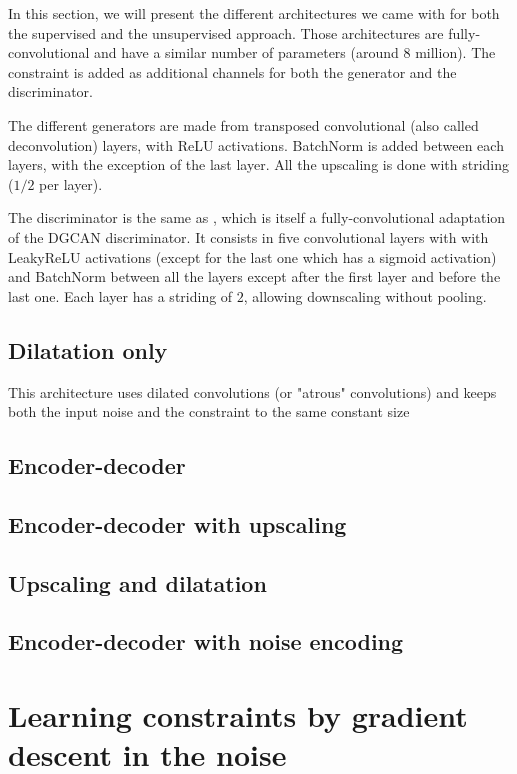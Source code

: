 \documentclass{article}
\begin{document}
	In this section, we will present the different architectures we came with for both the supervised and the unsupervised approach. Those architectures are fully-convolutional and have a similar number of parameters (around 8 million). The constraint is added as additional channels for both the generator and the discriminator.
	
	The different generators are made from transposed convolutional (also called deconvolution)  layers, with ReLU activations. BatchNorm\cite{ioffe15} is added between each layers, with the exception of the last layer. All the upscaling is done with striding ($1/2$ per layer).
	
	The discriminator is the same as \cite{jetchev}, which is itself a fully-convolutional adaptation of the DGCAN\cite{chintala14} discriminator. It consists in five convolutional layers with with LeakyReLU activations (except for the last one which has a sigmoid activation) and BatchNorm between all the layers except after the first layer and before the last one. Each layer has a striding of $2$, allowing downscaling without pooling.
		
	\subsection{Dilatation only}
	
		This architecture uses dilated convolutions (or "atrous" convolutions) and keeps both the input noise and the constraint to the same constant size
		
	\subsection{Encoder-decoder}
	\subsection{Encoder-decoder with upscaling}
	\subsection{Upscaling and dilatation}
	\subsection{Encoder-decoder with noise encoding}

\section{Learning constraints by gradient descent in the noise}
\end{document}
